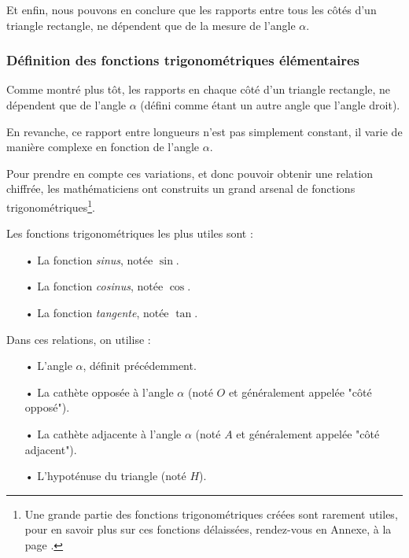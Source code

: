 \documentclass[a4paper]{article}
\begin{document}
			\medbreak

			Et enfin, 
			nous pouvons en conclure que les rapports entre tous les côtés d'un triangle rectangle,
			ne dépendent que de la mesure de l'angle $\alpha$.

			\bigbreak
			\bigbreak

		\subsubsection{Définition des fonctions trigonométriques élémentaires}

			Comme montré plus tôt, les rapports en chaque côté d'un triangle rectangle, 
			ne dépendent que de l'angle $\alpha$ (défini comme étant un autre angle que l'angle droit).
			
			En revanche, ce rapport entre longueurs n'est pas simplement constant, 
			il varie de manière complexe en fonction de l'angle $\alpha$.
			
			\medbreak

			Pour prendre en compte ces variations, et donc pouvoir obtenir une relation chiffrée, 
			les mathématiciens ont construits un grand arsenal de fonctions trigonométriques\footnote{
				Une grande partie des fonctions trigonométriques créées sont rarement utiles, 
				pour en savoir plus sur ces fonctions délaissées, rendez-vous en Annexe, à la page \pageref{fonction_trigo_chelous}.
			}. 
			

			{\noindent Les fonctions trigonométriques les plus utiles sont : }
			
			\begin{itemize}
				\item [•] La fonction \emph{sinus}, notée $\sin$.
				\item [•] La fonction \emph{cosinus}, notée $\cos$.
				\item [•] La fonction \emph{tangente}, notée $\tan$.
			\end{itemize}

			{\noindent Dans ces relations, on utilise : }
			
			\begin{itemize}
				\item [•] L'angle $\alpha$, définit précédemment.
				\item [•] La cathète opposée à l'angle $\alpha$ (noté $O$ et généralement appelée "côté opposé").
				\item [•] La cathète adjacente à l'angle $\alpha$ (noté $A$ et généralement appelée "côté adjacent").
				\item [•] L'hypoténuse du triangle (noté $H$).
			\end{itemize}
\end{document}
